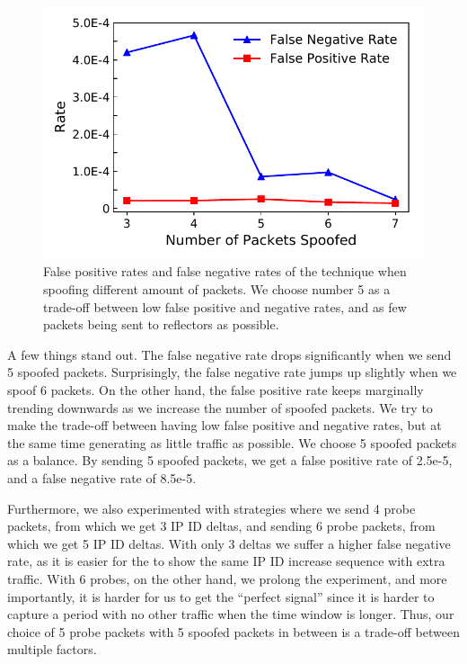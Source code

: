 
\begin{figure}[t]
\centering
\includegraphics[width=0.85\columnwidth]{images/false_positive_negative.pdf}
\caption{False positive rates and false negative rates of the technique when
spoofing different amount of packets. We choose number 5 as a trade-off
between low false positive and negative rates, and as few packets being sent
to reflectors as possible.}
\label{fig:fp_fn_analysis}
\end{figure}

A few things stand out. The false negative rate drops significantly when we
send 5 spoofed packets. Surprisingly, the false negative rate jumps up
slightly when we spoof 6 packets. On the other hand, the false positive rate
keeps marginally trending downwards as we increase the number of spoofed
packets. We try to make the trade-off between having low false positive and
negative rates, but at the same time generating as little traffic as possible.
We choose 5 spoofed packets as a balance. By sending 5 spoofed packets, we
get a false positive rate of 2.5e-5, and a false negative rate of 8.5e-5.

Furthermore, we also experimented with strategies where we send 4 probe packets, from which
we get 3 IP ID deltas, and sending 6 probe packets, from which we get 5 IP ID
deltas. With only 3 deltas we suffer a higher false negative rate, as it is
easier for the {} to show the same IP ID increase sequence with
extra traffic. With 6 probes, on the other hand, we prolong the experiment,
and more importantly, it is harder for us to get the ``perfect signal'' since
it is harder to capture a period with no other traffic when the time window
is longer. Thus, our choice of 5 probe packets with 5 spoofed packets in
between is a trade-off between multiple factors.

